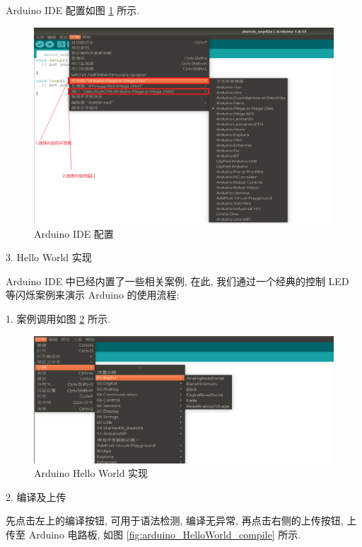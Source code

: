 \documentclass[openany, fontset=windowsold]{ctexbook}
\theoremstyle{kaiti}
\theoremstyle{normal}
\begin{document}
Arduino IDE 配置如图 \ref{fig:Arduino_IDE_settings} 所示.

\begin{figure}[!ht]
  \centering
  \includegraphics[width=.9\textwidth]{Arduino_IDE_settings.png}
  \caption{Arduino IDE 配置}
  \label{fig:Arduino_IDE_settings}
\end{figure}

3. Hello World 实现

Arduino IDE 中已经内置了一些相关案例, 在此, 我们通过一个经典的控制 LED 等闪烁案例来演示 Arduino 的使用流程:

1. 案例调用如图 \ref{fig:arduino_HelloWorld} 所示.

\begin{figure}[!ht]
  \centering
  \includegraphics[width=.9\textwidth]{arduino_HelloWorld.png}
  \caption{Arduino Hello World 实现}
  \label{fig:arduino_HelloWorld}
\end{figure}

2. 编译及上传

先点击左上的编译按钮, 可用于语法检测, 编译无异常, 再点击右侧的上传按钮, 上传至 Arduino 电路板, 如图 \ref{fig:arduino_HelloWorld_compile} 所示.
\end{document}
